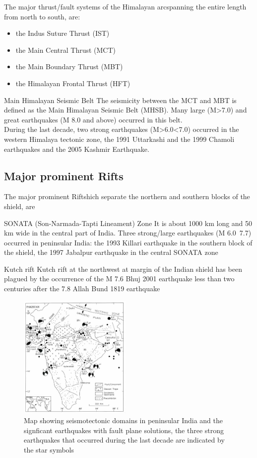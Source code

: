 \documentclass[smaller]{beamer}
\begin{document}
\begin{frame}{The major thrust/fault systems of the Himalayan arc}{spanning the entire
length from north to south, are:}
\begin{itemize}
	\item the Indus Suture Thrust (IST)
	\item the Main Central Thrust (MCT)
	\item the Main Boundary Thrust (MBT)
	\item the Himalayan Frontal Thrust (HFT)
\end{itemize}
\begin{block}{Main Himalayan Seismic Belt}
The seismicity between the MCT
and MBT is defined as the Main Himalayan Seismic Belt
(MHSB).
Many large (M>7.0) and great earthquakes
(M 8.0 and above) occurred in this belt.\\
During the last decade, two strong earthquakes
(M>6.0<7.0) occurred in the western Himalaya tectonic
zone, the 1991 Uttarkashi and the 1999 Chamoli
earthquakes and the 2005 Kashmir Earthquake.
\end{block}
\end{frame}
\subsection{Major prominent Rifts}
\begin{frame}{The major prominent Rifts}{hich separate the northern and southern blocks of the shield, are}
  \begin{block}{SONATA (Son-Narmada-Tapti Lineament) Zone}
	It is about 1000 km long and 50 km wide in the central part of India.
Three strong/large earthquakes (M 6.0~7.7) occurred in peninsular India: the 1993 Killari
earthquake in the southern block of the shield, the 1997
Jabalpur earthquake in the central SONATA zone
	\end{block}
	\begin{block}{Kutch rift}
	Kutch rift at the northwest at margin of the Indian shield has been plagued by the occurrence of the M 7.6 Bhuj 2001
earthquake less than two centuries after the 7.8 Allah Bund 1819 earthquake
	\end{block}
\end{frame}
\begin{frame}
\begin{figure}
\includegraphics[height=6cm]{flmap.png}
\caption{Map showing seismotectonic domains in peninsular India and the signficant earthquakes with fault plane solutions, the three strong
earthquakes that occurred during the last decade are indicated by the star symbols}
\end{figure}
\end{frame}
\end{document}
